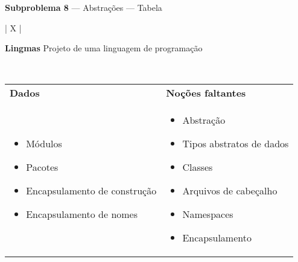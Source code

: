 \documentclass[12pt, a4paper]{article}
\begin{document}
\begin{center}
\large \textbf{Subproblema 8} --- Abstrações --- Tabela
\end{center}

\bigskip

\begin{longtabu}{| X |}
    \hline
    \begin{center}
        \large \textbf{Lingmas} \linebreak
        Projeto de uma linguagem de programação
    \end{center}
    \\ \hline

    \begin{tabu}{ X | X }
        \textbf{Dados} &
        \textbf{Noções faltantes}
        \\
        \begin{minipage}[t]{\linewidth}
        \begin{itemize}[itemsep=.5ex,parsep=.0ex,after=\strut,leftmargin=15pt]
            \item Módulos
            \item Pacotes
            \item Encapsulamento de construção
            \item Encapsulamento de nomes
        \end{itemize}
        \end{minipage}
        &
        \begin{minipage}[t]{\linewidth}
        \begin{itemize}[itemsep=.5ex,parsep=.0ex,after=\strut,leftmargin=15pt]
            \item Abstração
            \item Tipos abstratos de dados
            \item Classes
            \item Arquivos de cabeçalho
            \item Namespaces
            \item Encapsulamento
        \end{itemize}
        \end{minipage}
    \end{tabu}
    \\ \hline


\end{longtabu}
\end{document}
